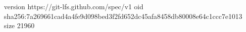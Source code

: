 version https://git-lfs.github.com/spec/v1
oid sha256:7a269661cad4a4fe9d098bed3f2fd652dc45afa8458db80008e64c1ccc7e1013
size 21960
